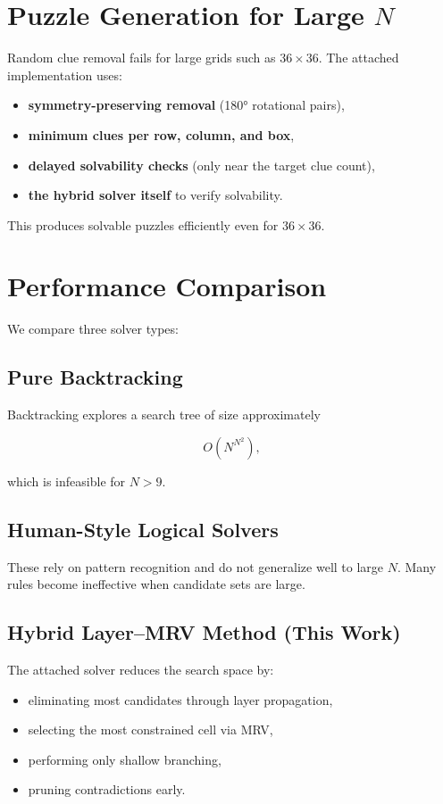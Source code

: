 \documentclass[11pt]{article}
\begin{document}
\section{Puzzle Generation for Large $N$}
Random clue removal fails for large grids such as $36 \times 36$.
The attached implementation uses:
\begin{itemize}
    \item \textbf{symmetry-preserving removal} (180° rotational pairs),
    \item \textbf{minimum clues per row, column, and box},
    \item \textbf{delayed solvability checks} (only near the target clue count),
    \item \textbf{the hybrid solver itself} to verify solvability.
\end{itemize}
This produces solvable puzzles efficiently even for $36 \times 36$.

\section{Performance Comparison}
We compare three solver types:

\subsection{Pure Backtracking}
Backtracking explores a search tree of size approximately


\[
O(N^{N^2}),
\]


which is infeasible for $N > 9$.

\subsection{Human-Style Logical Solvers}
These rely on pattern recognition and do not generalize well to large $N$.
Many rules become ineffective when candidate sets are large.

\subsection{Hybrid Layer--MRV Method (This Work)}
The attached solver reduces the search space by:
\begin{itemize}
    \item eliminating most candidates through layer propagation,
    \item selecting the most constrained cell via MRV,
    \item performing only shallow branching,
    \item pruning contradictions early.
\end{itemize}
\end{document}
